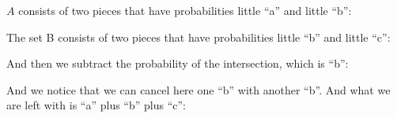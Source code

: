 \documentclass[pdftex, brazil, 12pt, twoside]{article}
\begin{document}
$A$ consists of two pieces that have probabilities little ``a''
and little ``b'':

\begin{figure}[H]
  \begin{center}
  \end{center}
\end{figure}

The set B consists of two pieces that have probabilities
little ``b'' and little ``c'':

\begin{figure}[H]
  \begin{center}
  \end{center}
\end{figure}

And then we subtract the probability of the
intersection, which is ``b'':

\begin{figure}[H]
  \begin{center}
  \end{center}
\end{figure}

And we notice that we can cancel here one ``b''
with another ``b''. And what we are left with is ``a'' plus ``b'' plus ``c'':
\end{document}
